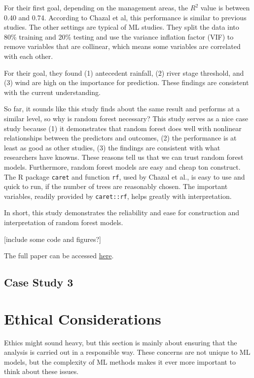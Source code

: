 \documentclass[
]{book}
\begin{document}
For their first goal, depending on the management areas, the \(R^2\) value is between 0.40 and 0.74. According to Chazal et al, this performance is similar to previous studies. The other settings are typical of ML studies. They split the data into 80\% training and 20\% testing and use the variance inflation factor (VIF) to remove variables that are collinear, which means some variables are correlated with each other.

For their goal, they found (1) antecedent rainfall, (2) river stage threshold, and (3) wind are high on the importance for prediction. These findings are consistent with the current understanding.

So far, it sounds like this study finds about the same result and performs at a similar level, so why is random forest necessary? This study serves as a nice case study because (1) it demonstrates that random forest does well with nonlinear relationships between the predictors and outcomes, (2) the performance is at least as good as other studies, (3) the findings are consistent with what researchers have knowns. These reasons tell us that we can trust random forest models. Furthermore, random forest models are easy and cheap ton construct. The R package \texttt{caret} and function \texttt{rf}, used by Chazal et al., is easy to use and quick to run, if the number of trees are reasonably chosen. The important variables, readily provided by \texttt{caret::rf}, helps greatly with interpretation.

In short, this study demonstrates the reliability and ease for construction and interpretation of random forest models.

{[}include some code and figures?{]}

The full paper can be accessed \href{https://www.sciencedirect.com/science/article/pii/S0025326X24000304?via\%3Dihub}{here}.

\hypertarget{case-study-3}{%
\section{Case Study 3}\label{case-study-3}}

\hypertarget{ethical-considerations}{%
\chapter{Ethical Considerations}\label{ethical-considerations}}

Ethics might sound heavy, but this section is mainly about ensuring that the analysis is carried out in a responsible way. These concerns are not unique to ML models, but the complexity of ML methods makes it ever more important to think about these issues.
\end{document}
